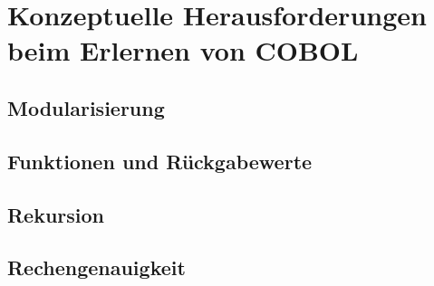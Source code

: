 \section{Konzeptuelle Herausforderungen beim Erlernen von COBOL}

\subsection{Modularisierung}

\subsection{Funktionen und Rückgabewerte}

\subsection{Rekursion}

\subsection{Rechengenauigkeit}